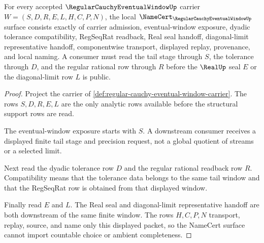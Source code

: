 \begin{theorem}
\label{thm:regular-cauchy-eventual-window-namecert-obligations}
For every accepted $\RegularCauchyEventualWindowUp$ carrier $W=(S,D,R,E,L,H,C,P,N)$, the local $\NameCert_{\RegularCauchyEventualWindowUp}$ surface consists exactly of carrier admission, eventual-window exposure, dyadic tolerance compatibility, RegSeqRat readback, Real seal handoff, diagonal-limit representative handoff, componentwise transport, displayed replay, provenance, and local naming. A consumer must read the tail stage through $S$, the tolerance through $D$, and the regular rational row through $R$ before the $\RealUp$ seal $E$ or the diagonal-limit row $L$ is public.
\end{theorem}
\begin{proof}
Project the carrier of \autoref{def:regular-cauchy-eventual-window-carrier}. The rows $S,D,R,E,L$ are the only analytic rows available before the structural support rows are read.

The eventual-window exposure starts with $S$. A downstream consumer receives a displayed finite tail stage and precision request, not a global quotient of streams or a selected limit.

Next read the dyadic tolerance row $D$ and the regular rational readback row $R$. Compatibility means that the tolerance data belongs to the same tail window and that the RegSeqRat row is obtained from that displayed window.

Finally read $E$ and $L$. The Real seal and diagonal-limit representative handoff are both downstream of the same finite window. The rows $H,C,P,N$ transport, replay, source, and name only this displayed packet, so the NameCert surface cannot import countable choice or ambient completeness.
\end{proof}

